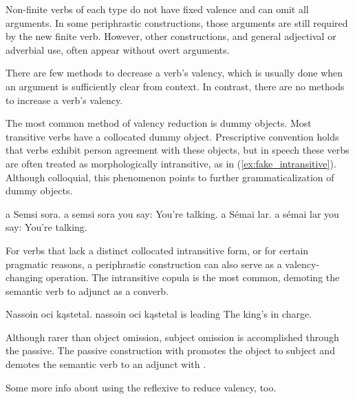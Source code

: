 Non-finite verbs of each type do not have fixed valence and can omit all arguments. In some periphrastic constructions, those arguments are still required by the new finite verb. However, other constructions, and general adjectival or adverbial use, often appear without overt arguments.

There are few methods to decrease a verb's valency, which is usually done when an argument is sufficiently clear from context. In contrast, there are no methods to increase a verb's valency.

The most common method of valency reduction is dummy objects. Most transitive verbs have a collocated dummy object. Prescriptive convention holds that verbs exhibit person agreement with these objects, but in speech these verbs are often treated as morphologically intransitive, as in (\ref{ex:fake_intransitive}). Although colloquial, this phenomenon points to further grammaticalization of dummy objects.

\begin{subexamples}
	\ex
		\script a Semsi sora.
		\bits a semsi sora
		\gloss you say: 
		\tr You're talking.
	\ex \label{ex:fake_intransitive}
		\script a Sémai lar.
		\bits a sémai lar
		\gloss you say: 
		\tr You're talking. 
\end{subexamples} 

For verbs that lack a distinct collocated intransitive form, or for certain pragmatic reasons, a periphrastic construction can also serve as a valency-changing operation. The intransitive copula  is the most common, demoting the semantic verb to adjunct as a converb.

\begin{example}
	\script Nassoin oci kąstetal.
	\bits nassoin oci kąstetal
	 is leading
	\tr The king's in charge.
\end{example}

Although rarer than object omission, subject omission is accomplished through the  passive. The passive construction with  promotes the object to subject and demotes the semantic verb to an adjunct with .

\begin{kaobox}[frametitle=\sc todo:]
	Some more info about using the reflexive to reduce valency, too.
\end{kaobox}

